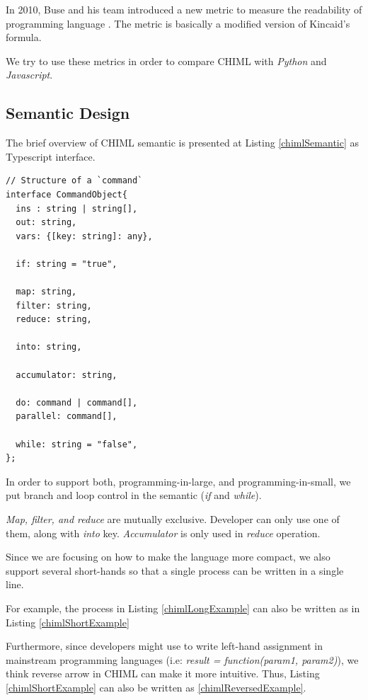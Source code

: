 \documentclass[conference]{IEEEtran}
\begin{document}
In 2010, Buse and his team introduced a new metric to measure the readability of programming language \cite{buse2010}. The metric is basically a modified version of Kincaid's formula.

We try to use these metrics in order to compare CHIML with {\it Python} and {\it Javascript}.

\subsection{Semantic Design}

The brief overview of CHIML semantic is presented at Listing \ref{chimlSemantic} as Typescript interface.

\begin{lstlisting}[caption=CHIML Semantic Design, label=chimlSemantic, basicstyle=\footnotesize, breaklines=true]
// Structure of a `command`
interface CommandObject{
  ins : string | string[],
  out: string,
  vars: {[key: string]: any},

  if: string = "true",

  map: string,
  filter: string,
  reduce: string,

  into: string,

  accumulator: string,

  do: command | command[],
  parallel: command[],

  while: string = "false",
};
\end{lstlisting}

In order to support both, programming-in-large, and programming-in-small, we put branch and loop control in the semantic ({\it if} and {\it while}). 

{\it Map, filter, and reduce} are mutually exclusive. Developer can only use one of them, along with {\it into} key. {\it Accumulator} is only used in {\it reduce} operation.

Since we are focusing on how to make the language more compact, we also support several short-hands so that a single process can be written in a single line.

For example, the process in Listing \ref{chimlLongExample} can also be written as in Listing \ref{chimlShortExample}

Furthermore, since developers might use to write left-hand assignment in mainstream programming languages (i.e: {\it result = function(param1, param2)}), we think reverse arrow in CHIML can make it more intuitive. Thus, Listing \ref{chimlShortExample} can also be written as \ref{chimlReversedExample}.
\end{document}
